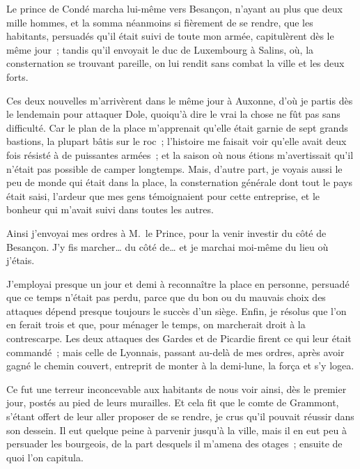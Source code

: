 \documentclass[french,twoside]{book} %
\begin{document}
Le prince de Condé marcha lui-même vers Besançon, n’ayant au plus que deux mille hommes, et la somma néanmoins si fièrement de se rendre, que les habitants, persuadés qu’il était suivi de toute mon armée, capitulèrent dès le même jour ; tandis qu’il envoyait le duc de Luxembourg à Salins, où, la consternation se trouvant pareille, on lui rendit sans combat la ville et les deux forts.\par
Ces deux nouvelles m’arrivèrent dans le même jour à Auxonne, d’où je partis dès le lendemain pour attaquer Dole, quoiqu’à dire le vrai la chose ne fût pas sans difficulté. Car le plan de la place m’apprenait qu’elle était garnie de sept grands bastions, la plupart bâtis sur le roc ; l’histoire me faisait voir qu’elle avait deux fois résisté à de puissantes armées ; et la saison où nous étions m’avertissait qu’il n’était pas possible de camper longtemps. Mais, d’autre part, je voyais aussi le peu de monde qui était dans la place, la consternation générale dont tout le pays était saisi, l’ardeur que mes gens témoignaient pour cette entreprise, et le bonheur qui m’avait suivi dans toutes les autres.\par
Ainsi j’envoyai mes ordres à M. le Prince, pour la venir investir du côté de Besançon. J’y fis marcher… du côté de… et je marchai moi-même du lieu où j’étais.\par
J’employai presque un jour et demi à reconnaître la place en personne, persuadé que ce temps n’était pas perdu, parce que du bon ou du mauvais choix des attaques dépend presque toujours le succès d’un siège. Enfin, je résolus que l’on en ferait trois et que, pour ménager le temps, on marcherait droit à la contrescarpe. Les deux attaques des Gardes et de Picardie firent ce qui leur était commandé ; mais celle de Lyonnais, passant au-delà de mes ordres, après avoir gagné le chemin couvert, entreprit de monter à la demi-lune, la força et s’y logea.\par
Ce fut une terreur inconcevable aux habitants de nous voir ainsi, dès le premier jour, postés au pied de leurs murailles. Et cela fit que le comte de Grammont, s’étant offert de leur aller proposer de se rendre, je crus qu’il pouvait réussir dans son dessein. Il eut quelque peine à parvenir jusqu’à la ville, mais il en eut peu à persuader les bourgeois, de la part desquels il m’amena des otages ; ensuite de quoi l’on capitula.\par
\end{document}
